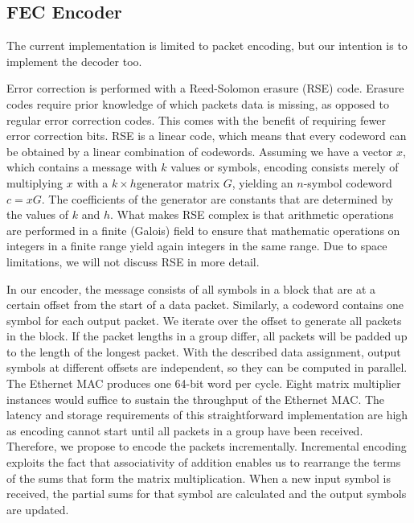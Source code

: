 \subsection{FEC Encoder}

The current implementation is limited to packet encoding, but our intention is
to implement the decoder too.

Error correction is performed with a Reed-Solomon erasure (RSE) code.  Erasure codes
require prior knowledge of which packets data is missing, as opposed to regular
error correction codes.  This comes with the benefit of requiring fewer error
correction bits.  RSE is a linear code, which means that every codeword can be
obtained by a linear combination of codewords.  Assuming we have a vector $x$,
which contains a message with $k$ values or symbols, encoding consists merely
of multiplying $x$ with a $k \times h$generator matrix $G$, yielding an $n$-symbol
codeword $c = xG$.  The coefficients of the
generator are constants that are determined by the values of $k$ and $h$.  What
makes RSE complex is that arithmetic operations are performed in a finite (Galois)
field to ensure that mathematic operations on integers in a finite range yield
again integers in the same range.  Due to space limitations, we will not discuss
RSE in more detail.

In our encoder, the message consists of all symbols in a block that are at a
certain offset from the start of a data packet.  Similarly, a codeword contains
one symbol for each output packet.  We iterate over the offset to generate
all packets in the block.  If the packet lengths in a group differ, all packets
will be padded up to the length of the longest packet.
With the described data assignment, output symbols at
different offsets are independent, so they can be computed in parallel.  The
Ethernet MAC produces one 64-bit word per cycle.  Eight matrix multiplier
instances would suffice to sustain the throughput of the Ethernet MAC.  The
latency and storage requirements of this straightforward implementation are
high as encoding cannot start until all packets in a group have been received.
Therefore, we propose to encode the packets incrementally.  Incremental
encoding exploits the fact that associativity of addition enables us to
rearrange the terms of the sums that form the matrix multiplication.
When a new input symbol is received, the partial sums for that symbol are
calculated and the output symbols are updated.


